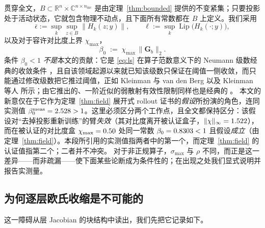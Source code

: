 \documentclass[UTF8,a4paper,11pt]{ctexart}
\newcommand{\R}{\mathbb{R}}
\newcommand{\C}{\mathbb{C}}
\newcommand{\norm}[1]{\lVert #1 \rVert}
\newcommand{\infn}[1]{\lVert #1 \rVert_{\infty}}
\newcommand{\numv}[1]{#1}
\begin{document}
贯穿全文，$B\subset\R^n\times\C^{n\times n_{\mathrm{inc}}}$ 是由定理~\ref{thm:bounded} 提供的不变紧集；只要投影处于活动状态，它就包含物理不动点，且下面所有常数都在 $B$ 上定义。我们采用
\begin{equation}\label{eq:budgets}
\bar\epsilon := \sup_{k}\sup_{z\in B}\norm{H_k(z;y)},\qquad
\ell := \sup_k \operatorname{Lip}\big(H_k(\cdot;y)\big),
\end{equation}
以及对于容许对比度上界 $\chi_{\max}$，
\begin{equation}\label{eq:beta0}
\beta_0 \;:=\; \chi_{\max}\,\norm{\mathbf{G}_b}_2 .
\end{equation}
条件 $\beta_0<1$ \emph{不是}本文的贡献：它是 \eqref{eq:ls} 在算子范数意义下的 Neumann 级数经典的收敛条件 \cite{born_lit}，且自该领域起源以来就已知该级数只保证在阈值一侧收敛，而只能通过修改级数把它推过阈值，正如 Kleinman 与 van den Berg \cite{kleinvandenberg} 以及 Kleinman 等人 \cite{convergentborn} 所示；由它推出的、一阶近似的弱散射有效性限制同样也是经典的 \cite{slaney}。
本文的新意仅在于它作为定理~\ref{thm:field} 展开式 rollout 证书的\emph{假设}所扮演的角色，连同实测值 $\beta_0^{\mathrm{meas}}=\numv{\NumBetaMeas}>1$。这里必须区分两个工作点，且全文都保持区分：该假设对“去掉投影重新训练”的臂\emph{失效}（其对比度离开被认证盒子，$\infn{\chi}=\numv{\NumAblUncPOffFbOnChi}$），而在被认证的对比度盒 $\chi_{\max}=\numv{\chimax}$ 处同一常数 $\beta_0=\numv{\betacert}<1$ 且假设\emph{成立}（由定理~\ref{thm:field}）。本段所引用的实测值指两者中的第一个，而定理~\ref{thm:field} 的认证值指第二个；二者并不冲突。
对于非正规算子，$\sigma_{\max}$ 与 $\rho$ 不同，而正是这一差异——而非疏漏——使下面某些论断成为条件性的；在出现之处我们显式说明并报告实测量。

\subsection{为何逐层欧氏收缩是不可能的}
这一障碍从层 Jacobian 的块结构中读出，我们先把它记录如下。
\end{document}
